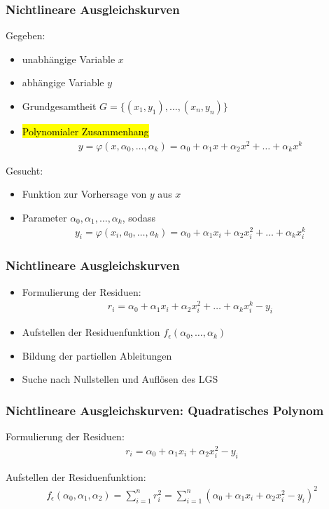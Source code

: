 \begin{frame}
\frametitle{Nichtlineare Ausgleichskurven}

Gegeben:
\begin{itemize}
	\item unabhängige Variable $x$
	\item abhängige Variable $y$
	\item Grundgesamtheit $G = \{(x_1, y_1), \dots, (x_n, y_n)\}$
	\item \hl{Polynomialer Zusammenhang} \begin{align*}
		y = \varphi(x, \alpha_0, \dots, \alpha_k) = \alpha_0 + \alpha_1 x + \alpha_2 x^2 + \dots + \alpha_k x^k
	\end{align*}
\end{itemize}

Gesucht:
\begin{itemize}
	\item Funktion zur Vorhersage von $y$ aus $x$
	\item Parameter $\alpha_0, \alpha_1, \dots, \alpha_k$, sodass \begin{align*}
		y_i = \varphi(x_i, a_0, \dots, a_k) = \alpha_0 + \alpha_1 x_i + \alpha_2 x_i^2 + \dots + \alpha_k x_i^k
	\end{align*}
\end{itemize}

\end{frame}


\begin{frame}
\frametitle{Nichtlineare Ausgleichskurven}

\begin{itemize}
	\item Formulierung der Residuen: \begin{align*}
		r_i = \alpha_0 + \alpha_1 x_i + \alpha_2 x_i^2 + \dots + \alpha_k x^k_i - y_i
	\end{align*}
	\item Aufstellen der Residuenfunktion $f_\epsilon(\alpha_0, \dots, \alpha_k)$
	\item Bildung der partiellen Ableitungen
	\item Suche nach Nullstellen und Auflösen des LGS
\end{itemize}

\end{frame}


\begin{frame}
\frametitle{Nichtlineare Ausgleichskurven: Quadratisches Polynom}

Formulierung der Residuen: \begin{align*}
	r_i = \alpha_0 + \alpha_1 x_i + \alpha_2 x_i^2 - y_i
\end{align*}

Aufstellen der Residuenfunktion: \begin{align*}
	f_\epsilon(\alpha_0, \alpha_1, \alpha_2) = \sum_{i=1}^{n} r_i^2 = \sum_{i=1}^{n} (\alpha_0 + \alpha_1 x_i + \alpha_2 x_i^2 - y_i)^2
\end{align*}

\end{frame}

